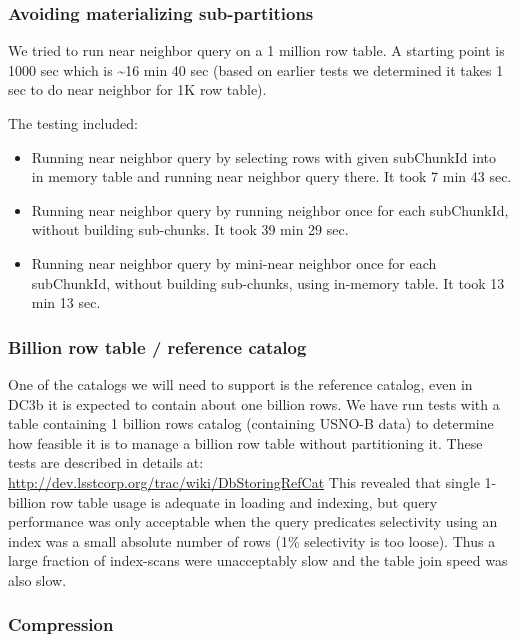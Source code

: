 \documentclass[DM,lsstdraft,toc]{lsstdoc}
\begin{document}
\subsubsection{Avoiding materializing
sub-partitions}\label{avoiding-materializing-sub-partitions}

We tried to run near neighbor query on a 1 million row table. A starting
point is 1000 sec which is \textasciitilde{}16 min 40 sec (based on
earlier tests we determined it takes 1 sec to do near neighbor for 1K
row table).

The testing included:

\begin{itemize}
\item
  Running near neighbor query by selecting rows with given subChunkId
  into in memory table and running near neighbor query there. It took 7
  min 43 sec.
\item
  Running near neighbor query by running neighbor once for each
  subChunkId, without building sub-chunks. It took 39 min 29 sec.
\item
  Running near neighbor query by mini-near neighbor once for each
  subChunkId, without building sub-chunks, using in-memory table. It
  took 13 min 13 sec.
\end{itemize}

\subsubsection{Billion row table / reference
catalog}\label{billion-row-table-reference-catalog}

One of the catalogs we will need to support is the reference catalog,
even in DC3b it is expected to contain about one billion rows. We have
run tests with a table containing 1 billion rows catalog (containing
USNO-B data) to determine how feasible it is to manage a billion row
table without partitioning it. These tests are described in details at:
\url{http://dev.lsstcorp.org/trac/wiki/DbStoringRefCat} This revealed
that single 1-billion row table usage is adequate in loading and
indexing, but query performance was only acceptable when the query
predicates selectivity using an index was a small absolute number of
rows (1\% selectivity is too loose). Thus a large fraction of
index-scans were unacceptably slow and the table join speed was also
slow.

\subsubsection{Compression}\label{compression}
\end{document}
